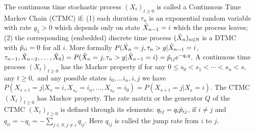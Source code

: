  The continuous time stochastic process $(X_t)_{t \ge 0}$ is called a Continuous Time Markov Chain (CTMC) if:
(1) each duration $\tau_n$ is an exponential random variable with rate $g_1 > 0$ which depends only on state $\Tilde{X}_{n-1} = i$ which the process leaves;
(2) the corresponding (embedded) discrete time process $(\Tilde{X}_n)_{n \in \mathbb{N}}$ is a DTMC with $\Tilde{p}_{ii} = 0$ for all $i$.
More formally $P(\Tilde{X}_n = j, \tau_n > y| \Tilde{X}_{n-1} = i$, $\tau_{n-1}, \Tilde{X}_{n-2}, \ldots, \Tilde{X}_0) = P(\Tilde{X}_n = j, \tau_n > y | \Tilde{X}_{n-1} = i) = \Tilde{p}_{ij}e^{-q_i y}.$
 A continuous time process $(X_t)_{t \ge 0}$ has the Markov property if for any $0 \le s_0 < s_1 < \cdots < s_n < s,$ any $t \ge 0,$ and any possible states $i_0, \ldots i_n, i,j$ we have $P(X_{s+t} = j | X_s = i, X_{s_n} = i_n, \ldots, X_{s_0} = i_0) = P(X_{s+t} = j | X_s = i)$.
 The CTMC $(X_t)_{t \ge 0}$ has Markov property.
 The rate matrix or the generator $Q$ of the CTMC $(X_t)_{t \ge 0}$ is defined through its elements: $q_{ij} = q_i\Tilde{p}_{ij}$, if $i \ne j$ and $q_{ii} = - q_i = - \sum_{j \in S, j \ne i} q_{ij}$. Here $q_{ij}$ is called the jump rate from $i$ to $j$.